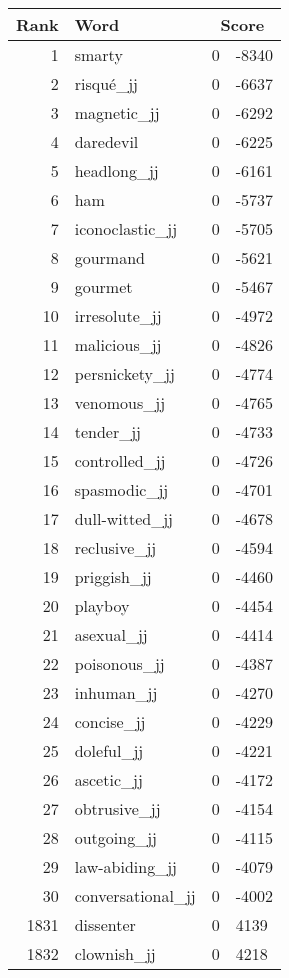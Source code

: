 \begin{longtable}[!htbp]{| rlr@{.}l |}
    \hline
    \textbf{Rank} & \textbf{Word} & \multicolumn{2}{c|}{\textbf{Score}} \\
    \hline
    \endhead
    1 & smarty & 0 & -8340 \\
    2 & risqué\_jj & 0 & -6637 \\
    3 & magnetic\_jj & 0 & -6292 \\
    4 & daredevil & 0 & -6225 \\
    5 & headlong\_jj & 0 & -6161 \\
    6 & ham & 0 & -5737 \\
    7 & iconoclastic\_jj & 0 & -5705 \\
    8 & gourmand & 0 & -5621 \\
    9 & gourmet & 0 & -5467 \\
    10 & irresolute\_jj & 0 & -4972 \\
    11 & malicious\_jj & 0 & -4826 \\
    12 & persnickety\_jj & 0 & -4774 \\
    13 & venomous\_jj & 0 & -4765 \\
    14 & tender\_jj & 0 & -4733 \\
    15 & controlled\_jj & 0 & -4726 \\
    16 & spasmodic\_jj & 0 & -4701 \\
    17 & dull-witted\_jj & 0 & -4678 \\
    18 & reclusive\_jj & 0 & -4594 \\
    19 & priggish\_jj & 0 & -4460 \\
    20 & playboy & 0 & -4454 \\
    21 & asexual\_jj & 0 & -4414 \\
    22 & poisonous\_jj & 0 & -4387 \\
    23 & inhuman\_jj & 0 & -4270 \\
    24 & concise\_jj & 0 & -4229 \\
    25 & doleful\_jj & 0 & -4221 \\
    26 & ascetic\_jj & 0 & -4172 \\
    27 & obtrusive\_jj & 0 & -4154 \\
    28 & outgoing\_jj & 0 & -4115 \\
    29 & law-abiding\_jj & 0 & -4079 \\
    30 & conversational\_jj & 0 & -4002 \\
    1831 & dissenter & 0 & 4139 \\
    1832 & clownish\_jj & 0 & 4218 \\

\end{longtable}
